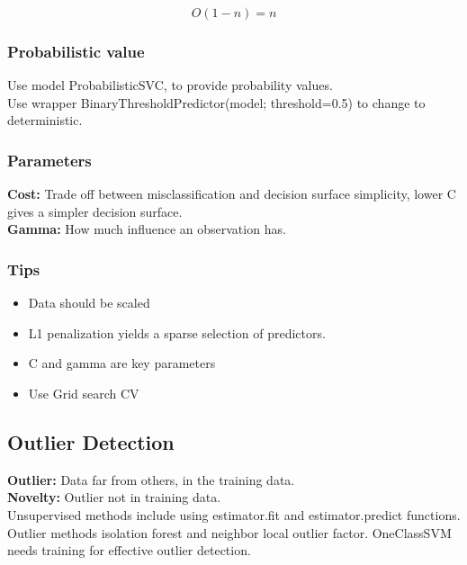 \documentclass[11pt]{scrartcl} %
\begin{document}
\begin{equation}
	O(1-n) = n
\end{equation}

\subsubsection{Probabilistic value}

Use model ProbabilisticSVC, to provide probability values.\\

Use wrapper BinaryThresholdPredictor(model; threshold=0.5) to change to deterministic.

\subsubsection{Parameters}

\textbf{Cost:} Trade off between misclassification and decision surface simplicity, lower C
gives a simpler decision surface.\\

\textbf{Gamma:} How much influence an observation has.

\subsubsection{Tips}

\begin{itemize}
	\item Data should be scaled
	\item L1 penalization yields a sparse selection of predictors.
	\item C and gamma are key parameters
	\item Use Grid search CV
\end{itemize}

\subsection{Outlier Detection}

\textbf{Outlier:} Data far from others, in the training data.\\
\textbf{Novelty:} Outlier not in training data.\\

Unsupervised methods include using estimator.fit and estimator.predict functions. Outlier methods
isolation forest and neighbor local outlier factor. OneClassSVM needs training for effective 
outlier detection.\\
\end{document}
